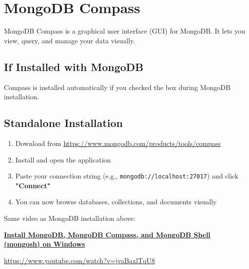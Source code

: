 \documentclass[12pt,a4paper]{article}
\begin{document}
\newpage

\section{MongoDB Compass}

MongoDB Compass is a graphical user interface (GUI) for MongoDB. It lets you view, query, and manage your data visually.

\subsection{If Installed with MongoDB}

Compass is installed automatically if you checked the box during MongoDB installation.

\subsection{Standalone Installation}

\begin{enumerate}[leftmargin=*,itemsep=0.5em]
    \item Download from \url{https://www.mongodb.com/products/tools/compass}
    \item Install and open the application
    \item Paste your connection string (e.g., \texttt{mongodb://localhost:27017}) and click \textbf{"Connect"}
    \item You can now browse databases, collections, and documents visually
\end{enumerate}

\begin{tcolorbox}[colback=infobox,colframe=primaryblue,title= YouTube Tutorial]
    Same video as MongoDB installation above:
    
    \href{https://www.youtube.com/watch?v=jvaBaxlTqU8}{\textbf{Install MongoDB, MongoDB Compass, and MongoDB Shell (mongosh) on Windows}}
    
    \url{https://www.youtube.com/watch?v=jvaBaxlTqU8}
\end{tcolorbox}

\newpage

\end{document}
